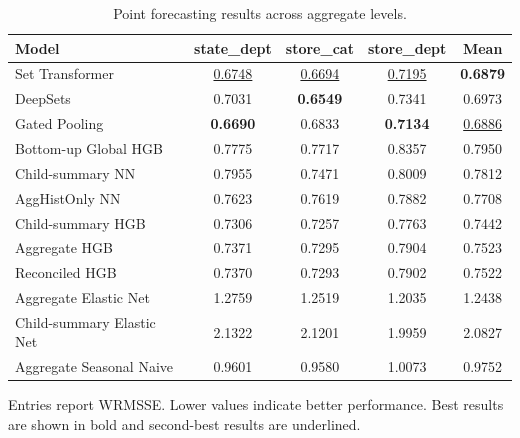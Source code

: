 \begin{table}[H]
\centering
\caption{Point forecasting results across aggregate levels.}
\label{tab:main_point}
\begin{threeparttable}
\begin{tabular}{lcccc}
\toprule
Model & state\_dept & store\_cat & store\_dept & Mean \\
\midrule
Set Transformer & \underline{0.6748} & \underline{0.6694} & \underline{0.7195} & \textbf{0.6879} \\
DeepSets & 0.7031 & \textbf{0.6549} & 0.7341 & 0.6973 \\
Gated Pooling & \textbf{0.6690} & 0.6833 & \textbf{0.7134} & \underline{0.6886} \\
Bottom-up Global HGB & 0.7775 & 0.7717 & 0.8357 & 0.7950 \\
Child-summary NN & 0.7955 & 0.7471 & 0.8009 & 0.7812 \\
AggHistOnly NN & 0.7623 & 0.7619 & 0.7882 & 0.7708 \\
Child-summary HGB & 0.7306 & 0.7257 & 0.7763 & 0.7442 \\
Aggregate HGB & 0.7371 & 0.7295 & 0.7904 & 0.7523 \\
Reconciled HGB & 0.7370 & 0.7293 & 0.7902 & 0.7522 \\
Aggregate Elastic Net & 1.2759 & 1.2519 & 1.2035 & 1.2438 \\
Child-summary Elastic Net & 2.1322 & 2.1201 & 1.9959 & 2.0827 \\
Aggregate Seasonal Naive & 0.9601 & 0.9580 & 1.0073 & 0.9752 \\
\bottomrule
\end{tabular}
\begin{tablenotes}
\footnotesize \item Entries report WRMSSE. Lower values indicate better performance. Best results are shown in bold and second-best results are underlined.
\end{tablenotes}
\end{threeparttable}
\end{table}
